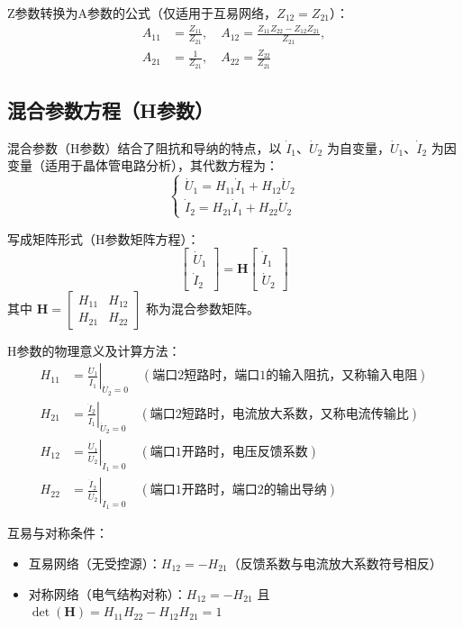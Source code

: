 Z参数转换为A参数的公式（仅适用于互易网络，$Z_{12}=Z_{21}$）：
\[
\begin{aligned}
A_{11} &= \frac{Z_{11}}{Z_{21}}, \quad A_{12} = \frac{Z_{11}Z_{22} - Z_{12}Z_{21}}{Z_{21}}, \\
A_{21} &= \frac{1}{Z_{21}}, \quad A_{22} = \frac{Z_{22}}{Z_{21}}
\end{aligned}
\]

\subsection{混合参数方程（H参数）}
混合参数（H参数）结合了阻抗和导纳的特点，以 $\dot{I}_1\text{、}\dot{U}_2$ 为自变量，$\dot{U}_1\text{、}\dot{I}_2$ 为因变量（适用于晶体管电路分析），其代数方程为：
\[
\begin{cases} 
\dot{U}_1 = H_{11}\dot{I}_1 + H_{12}\dot{U}_2 \\ 
\dot{I}_2 = H_{21}\dot{I}_1 + H_{22}\dot{U}_2 
\end{cases}
\]

写成矩阵形式（H参数矩阵方程）：
\[
\begin{bmatrix} 
\dot{U}_1 \\ 
\dot{I}_2 
\end{bmatrix} = 
\mathbf{H}
\begin{bmatrix} 
\dot{I}_1 \\ 
\dot{U}_2 
\end{bmatrix}
\]
其中 $\mathbf{H} = \begin{bmatrix} H_{11} & H_{12} \\ H_{21} & H_{22} \end{bmatrix}$ 称为混合参数矩阵。

H参数的物理意义及计算方法：
\[
\begin{aligned}
H_{11} &= \left. \frac{\dot{U}_1}{\dot{I}_1} \right|_{\dot{U}_2 = 0} \quad (\text{端口2短路时，端口1的输入阻抗，又称输入电阻}) \\
H_{21} &= \left. \frac{\dot{I}_2}{\dot{I}_1} \right|_{\dot{U}_2 = 0} \quad (\text{端口2短路时，电流放大系数，又称电流传输比}) \\
H_{12} &= \left. \frac{\dot{U}_1}{\dot{U}_2} \right|_{\dot{I}_1 = 0} \quad (\text{端口1开路时，电压反馈系数}) \\
H_{22} &= \left. \frac{\dot{I}_2}{\dot{U}_2} \right|_{\dot{I}_1 = 0} \quad (\text{端口1开路时，端口2的输出导纳})
\end{aligned}
\]

互易与对称条件：
\begin{itemize}
    \item 互易网络（无受控源）：$H_{12} = -H_{21}$（反馈系数与电流放大系数符号相反）
    \item 对称网络（电气结构对称）：$H_{12} = -H_{21}$ 且 $\det(\mathbf{H}) = H_{11}H_{22} - H_{12}H_{21} = 1$
\end{itemize}


